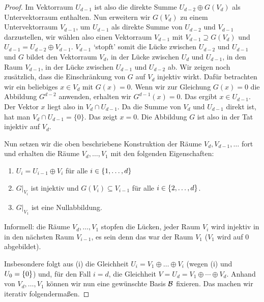 \begin{proof}
	Im Vektorraum $U_{d-1}$ ist also die direkte Summe $U_{d-2} \oplus G(V_d)$ als Untervektorraum enthalten. Nun erweitern wir $G(V_d)$ zu einem Untervektorraum $V_{d-1}$, um $U_{d-1}$ als direkte Summe von $U_{d-2}$ und $V_{d-1}$ darzustellen, wir wählen also einen Vektorraum $V_{d-1}$ mit $V_{d-1} \supseteq G(V_d)$ und $U_{d-1} = U_{d-2} \oplus V_{d-1}$. $V_{d-1}$ `stopft' somit die Lücke zwischen $U_{d-2}$ und $U_{d-1}$ und $G$ bildet den Vektorraum $V_d$, in der Lücke zwischen $U_d$ und $U_{d-1}$, in den Raum $V_{d-1}$, in der Lücke zwischen $U_{d-1}$ und $U_{d-2}$ ab. Wir zeigen noch zusätzlich, dass die Einschränkung von $G$ auf $V_d$ injektiv wirkt. Dafür betrachten wir ein beliebiges $x \in V_d$ mit $G(x) = 0$. Wenn wir zur Gleichung $G(x) =0$ die Abbildung $G^{d-2}$ anwenden, erhalten wir $G^{d-1} (x) =0$. Das ergibt $x \in U_{d-1}$. Der Vektor $x$ liegt also in $V_d \cap U_{d-1}$. Da die Summe von $V_d$ und $U_{d-1}$ direkt ist, hat man $V_d \cap U_{d-1} =\{0\}$. Das zeigt $x=0$. Die Abbildung $G$ ist also in der Tat injektiv auf $V_d$. 
	
	Nun setzen wir die oben beschriebene Konstruktion der Räume $V_d, V_{d-1},\ldots$ fort und erhalten die Räume $V_d,\ldots,V_1$ mit den folgenden Eigenschaften: 
	\begin{enumerate}
	\item
	$ U_i = U_{i-1} \oplus V_i $ für alle $ i \in \{ 1,\ldots,d \} $
	\item
	$ G|_{V_i} $ ist injektiv und $ G(V_i) \subseteq V_{i-1} $ für alle $ i \in \{ 2,\ldots,d \} $.
	\item
	$ G|_{V_1} $ ist eine Nullabbildung.
\end{enumerate}
Informell: die Räume $V_d,\ldots,V_1$ stopfen die Lücken, jeder Raum $V_i$ wird injektiv in in den nächsten Raum $V_{i-1}$, es sein denn das war der Raum $V_1$ ($V_1$ wird auf $0$ abgebildet). 

	Insbesondere folgt aus (i) die Gleichheit $ U_i = V_1 \oplus \ldots \oplus V_i $ (wegen (i) und $ U_0 = \left\{ 0 \right\} $) und, für den Fall $ i = d $, die Gleichheit $ V = U_d = V_1 \oplus \cdots \oplus V_d $. Anhand von $V_d,\ldots,V_1$ können wir nun eine gewünschte Basis $\mathcal{B}$ fixieren. Das machen wir iterativ folgendermaßen. 
	

\end{proof}
